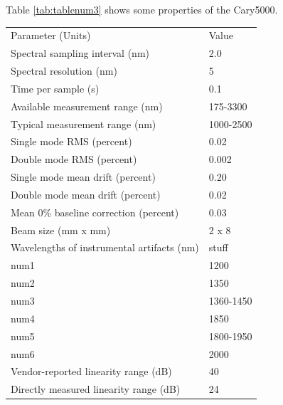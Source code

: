 \documentclass[osajnl,preprint,showpacs,superscriptaddress,12pt]{revtex4-1} %
\begin{document}
Table \ref{tab:tablenum3} shows some properties of the Cary5000.


\begin{center}
    \begin{tabular}{l l}
        Parameter (Units) & Value \\ 
        Spectral sampling interval (nm) & 2.0 \\
        Spectral resolution (nm) & 5 \\
        Time per sample (s) & 0.1 \\
        Available measurement range (nm) & 175-3300 \\
        Typical measurement range (nm) & 1000-2500 \\
	Single mode RMS  (percent) & 0.02 \\
	Double mode RMS  (percent) & 0.002 \\
	Single mode mean drift (percent) & 0.20 \\
	Double mode mean drift (percent) & 0.02 \\
	Mean 0\% baseline correction (percent) & 0.03 \\
 	Beam size (mm x mm) & 2 x 8 \\
	Wavelengths of instrumental artifacts (nm) & stuff \\
        num1 & 1200 \\
        num2 & 1350 \\
        num3 & 1360-1450\\
        num4 & 1850 \\
        num5 & 1800-1950 \\
        num6 & 2000 \\
        Vendor-reported linearity range (dB) & 40 \\
        Directly measured linearity range (dB) & 24 \\
      \end{tabular}
\end{center}
\end{document}
